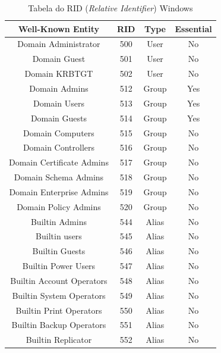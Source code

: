 \begin{table}[h!]
	\centering
	\caption{Tabela do RID (\textit{Relative Identifier}) Windows \cite{RID}}
	\begin{tabular}{cccc}
		
		\hline
		
		Well-Known Entity & RID & Type &	Essential \\
		
		\hline
		
		\hline
		
		Domain Administrator & 500 & User & No \\
		Domain Guest & 501 & User & No \\		
		Domain KRBTGT & 502	& User & No \\
		Domain Admins & 512 & Group & Yes \\
		Domain Users & 513 & Group & Yes \\
		Domain Guests & 514 & Group & Yes \\
		Domain Computers & 515 & Group & No \\
		Domain Controllers & 516 & Group & No \\
		Domain Certificate Admins & 517 & Group & No \\
		Domain Schema Admins & 518 & Group & No \\		
		Domain Enterprise Admins & 519 & Group & No \\
		Domain Policy Admins & 520 & Group & No \\
		Builtin Admins & 544 & Alias & No \\
		Builtin users & 545 & Alias & No \\
		Builtin Guests & 546 & Alias & No \\
		Builtin Power Users & 547 & Alias & No \\
		Builtin Account Operators & 548 & Alias & No \\
		Builtin System Operators & 549 & Alias & No \\
		Builtin Print Operators	& 550 & Alias & No \\
		Builtin Backup Operators & 551 & Alias & No \\
		Builtin Replicator & 552 & Alias & No \\
		 	
		\hline
	\end{tabular}
	\label{tab}
\end{table}

\clearpage

